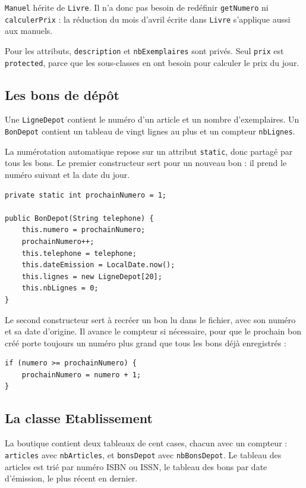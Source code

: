 \documentclass[11pt,a4paper]{article}
\newcommand{\code}[1]{\texttt{#1}}
\begin{document}
\code{Manuel} hérite de \code{Livre}. Il n'a donc pas besoin de redéfinir \code{getNumero} ni
\code{calculerPrix} : la réduction du mois d'avril écrite dans \code{Livre} s'applique aussi aux
manuels.

Pour les attributs, \code{description} et \code{nbExemplaires} sont privés. Seul \code{prix} est
\code{protected}, parce que les sous-classes en ont besoin pour calculer le prix du jour.

\subsection{Les bons de dépôt}

Une \code{LigneDepot} contient le numéro d'un article et un nombre d'exemplaires. Un
\code{BonDepot} contient un tableau de vingt lignes au plus et un compteur \code{nbLignes}.

La numérotation automatique repose sur un attribut \code{static}, donc partagé par tous les bons.
Le premier constructeur sert pour un nouveau bon : il prend le numéro suivant et la date du jour.

\begin{lstlisting}
private static int prochainNumero = 1;

public BonDepot(String telephone) {
    this.numero = prochainNumero;
    prochainNumero++;
    this.telephone = telephone;
    this.dateEmission = LocalDate.now();
    this.lignes = new LigneDepot[20];
    this.nbLignes = 0;
}
\end{lstlisting}

Le second constructeur sert à recréer un bon lu dans le fichier, avec son numéro et sa date
d'origine. Il avance le compteur si nécessaire, pour que le prochain bon créé porte toujours un
numéro plus grand que tous les bons déjà enregistrés :

\begin{lstlisting}
if (numero >= prochainNumero) {
    prochainNumero = numero + 1;
}
\end{lstlisting}

\subsection{La classe Etablissement}

La boutique contient deux tableaux de cent cases, chacun avec un compteur : \code{articles} avec
\code{nbArticles}, et \code{bonsDepot} avec \code{nbBonsDepot}. Le tableau des articles est trié
par numéro ISBN ou ISSN, le tableau des bons par date d'émission, le plus récent en dernier.
\end{document}
